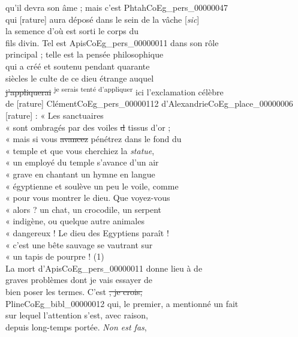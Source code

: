 \documentclass{book}
\begin{document}
{\begin{paracol}{2}
qu’il devra son âme ; mais c’est Phtah\gls{CoEg_pers_00000047}\\
qui [rature] aura déposé dans le sein de la vâche [\textit{sic}]\\
la semence d’où est sorti le corps du\\
fils divin. Tel est Apis\gls{CoEg_pers_00000011} dans son rôle\\
principal ; telle est la pensée philosophique\\
qui a créé et soutenu pendant quarante\\
siècles le culte de ce dieu étrange auquel\\
\sout{j’appliquerai} \textsuperscript{je serais tenté d’appliquer} ici l’exclamation célèbre\\
\scriptsize{de [rature] Clément\gls{CoEg_pers_00000112} d’Alexandrie\gls{CoEg_place_00000006} [rature] : « Les sanctuaires}\\
\footnotesize{« sont ombragés par des voiles \sout{d} tissus d’or ;}\\
« mais si vous \sout{avancez} pénétrez dans le fond du\\
« temple et que vous cherchiez la \textit{statue},\\
« un employé du temple s’avance d’un air\\
« grave en chantant un hymne en langue\\
« égyptienne et soulève un peu le voile, comme\\
« pour vous montrer le dieu. Que voyez-vous\\
« alors ? un chat, un crocodile, un serpent\\
« indigène, ou quelque autre animales\\
« dangereux ! Le dieu des Egyptiens paraît !\\
« c’est une bête sauvage se vautrant sur\\
« un tapis de pourpre ! (1)\\
\indent La mort d’Apis\gls{CoEg_pers_00000011} donne lieu à de\\
graves problèmes dont je vais essayer de\\
bien poser les termes. C’est \sout{, je crois,}\\
Pline\gls{CoEg_bibl_00000012} qui, le premier, a mentionné un fait\\
sur lequel l’attention s’est, avec raison,\\
depuis long-temps portée. \textit{Non est fas},
\end{paracol}
\begin{paracol}{2}

\end{paracol}}
\end{document}
